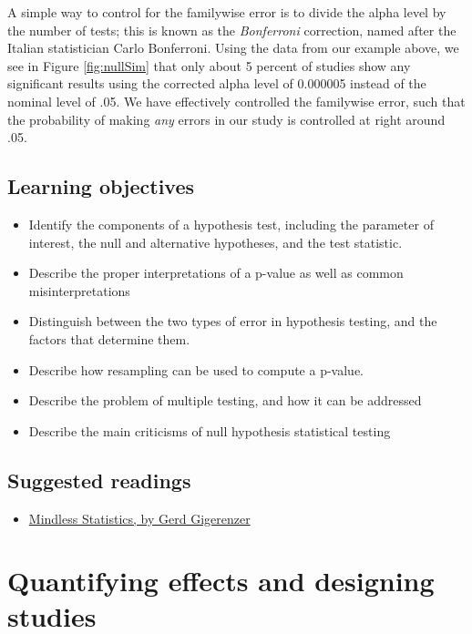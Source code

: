 \documentclass[12pt,]{book}
\providecommand{\tightlist}{%
  \setlength{\itemsep}{0pt}\setlength{\parskip}{0pt}}
\theoremstyle{definition}
\theoremstyle{definition}
\theoremstyle{definition}
\theoremstyle{remark}
\begin{document}
A simple way to control for the familywise error is to divide the alpha level by the number of tests; this is known as the \emph{Bonferroni} correction, named after the Italian statistician Carlo Bonferroni. Using the data from our example above, we see in Figure \ref{fig:nullSim} that only about 5 percent of studies show any significant results using the corrected alpha level of 0.000005 instead of the nominal level of .05. We have effectively controlled the familywise error, such that the probability of making \emph{any} errors in our study is controlled at right around .05.

\hypertarget{learning-objectives-8}{%
\section{Learning objectives}\label{learning-objectives-8}}

\begin{itemize}
\tightlist
\item
  Identify the components of a hypothesis test, including the parameter of interest, the null and alternative hypotheses, and the test statistic.
\item
  Describe the proper interpretations of a p-value as well as common misinterpretations
\item
  Distinguish between the two types of error in hypothesis testing, and the factors that determine them.
\item
  Describe how resampling can be used to compute a p-value.
\item
  Describe the problem of multiple testing, and how it can be addressed
\item
  Describe the main criticisms of null hypothesis statistical testing
\end{itemize}

\hypertarget{suggested-readings-6}{%
\section{Suggested readings}\label{suggested-readings-6}}

\begin{itemize}
\tightlist
\item
  \href{https://library.mpib-berlin.mpg.de/ft/gg/GG_Mindless_2004.pdf}{Mindless Statistics, by Gerd Gigerenzer}
\end{itemize}

\hypertarget{ci-effect-size-power}{%
\chapter{Quantifying effects and designing studies}\label{ci-effect-size-power}}
\end{document}
